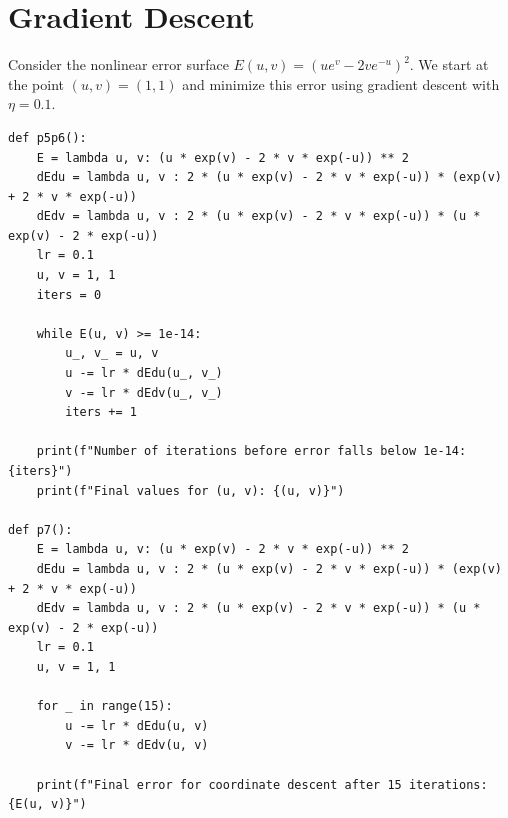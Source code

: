 \documentclass[answers]{exam}
\begin{document}
\section*{Gradient Descent}

Consider the nonlinear error surface \( E(u, v) = (u e^v - 2 v e^{-u})^2 \). 
We start at the point \( (u, v) = (1, 1) \) and minimize this error using 
gradient descent with \( \eta = 0.1 \).

\begin{verbatim}
def p5p6():
    E = lambda u, v: (u * exp(v) - 2 * v * exp(-u)) ** 2
    dEdu = lambda u, v : 2 * (u * exp(v) - 2 * v * exp(-u)) * (exp(v) + 2 * v * exp(-u)) 
    dEdv = lambda u, v : 2 * (u * exp(v) - 2 * v * exp(-u)) * (u * exp(v) - 2 * exp(-u)) 
    lr = 0.1
    u, v = 1, 1 
    iters = 0

    while E(u, v) >= 1e-14:
        u_, v_ = u, v
        u -= lr * dEdu(u_, v_)
        v -= lr * dEdv(u_, v_)
        iters += 1

    print(f"Number of iterations before error falls below 1e-14: {iters}")
    print(f"Final values for (u, v): {(u, v)}")

def p7():
    E = lambda u, v: (u * exp(v) - 2 * v * exp(-u)) ** 2
    dEdu = lambda u, v : 2 * (u * exp(v) - 2 * v * exp(-u)) * (exp(v) + 2 * v * exp(-u)) 
    dEdv = lambda u, v : 2 * (u * exp(v) - 2 * v * exp(-u)) * (u * exp(v) - 2 * exp(-u)) 
    lr = 0.1
    u, v = 1, 1 

    for _ in range(15):
        u -= lr * dEdu(u, v)
        v -= lr * dEdv(u, v)

    print(f"Final error for coordinate descent after 15 iterations: {E(u, v)}")
\end{verbatim}
\end{document}
